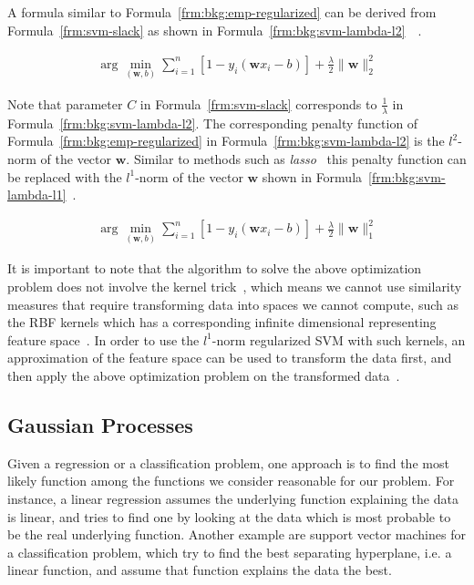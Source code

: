 A formula similar to Formula~\ref{frm:bkg:emp-regularized} can be derived from Formula~\ref{frm:svm-slack} as shown in Formula~\ref{frm:bkg:svm-lambda-l2}~\cite[Ch. 12]{statistical-learning}~\cite{hastie2004entire}.

\begin{align}
  \arg\min_{(\mathbf{w},b)}\sum_{i=1}^{n}[1-y_i(\mathbf{w}x_i - b)] + \frac{\lambda}{2}\|\mathbf{w}\|_2^2
  \label{frm:bkg:svm-lambda-l2}
\end{align}

Note that parameter $C$ in Formula~\ref{frm:svm-slack} corresponds to $\frac{1}{\lambda}$ in Formula~\ref{frm:bkg:svm-lambda-l2}. The corresponding penalty function of Formula~\ref{frm:bkg:emp-regularized} in Formula~\ref{frm:bkg:svm-lambda-l2} is the $l^2$-norm of the vector $\mathbf{w}$. Similar to methods such as \emph{lasso}~\cite[Ch. 3]{statistical-learning} this penalty function can be replaced with the $l^1$-norm of the vector $\mathbf{w}$ shown in Formula~\ref{frm:bkg:svm-lambda-l1}~\cite{zhu20041}.

\begin{align}
  \arg\min_{(\mathbf{w},b)}\sum_{i=1}^{n}[1-y_i(\mathbf{w}x_i - b)] + \frac{\lambda}{2}\|\mathbf{w}\|_1^2
  \label{frm:bkg:svm-lambda-l1}
\end{align}

It is important to note that the algorithm to solve the above optimization problem does not involve the kernel trick~\cite{zhu20041}, which means we cannot use similarity measures that require transforming data into spaces we cannot compute, such as the RBF kernels which has a corresponding infinite dimensional representing feature space~\cite[Ch. 2.3]{learning-with-kernels}. In order to use the $l^1$-norm regularized SVM with such kernels, an approximation of the feature space can be used to transform the data first, and then apply the above optimization problem on the transformed data~\cite{rahimi2007random}.

\subsection{Gaussian Processes}
Given a regression or a classification problem, one approach is to find the most likely function among the functions we consider reasonable for our problem. For instance, a linear regression assumes the underlying function explaining the data is linear, and tries to find one by looking at the data which is most probable to be the real underlying function. Another example are support vector machines for a classification problem, which try to find the best separating hyperplane, i.e. a linear function, and assume that function explains the data the best.

